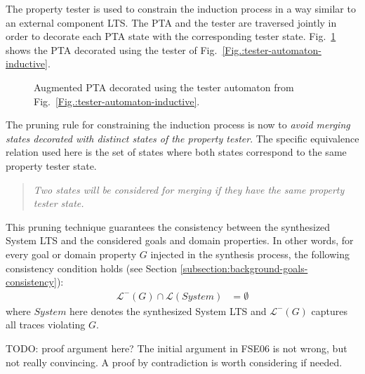 The property tester is used to constrain the induction process in a way similar to an external component LTS. The PTA and the tester are traversed jointly in order to decorate each PTA state with the corresponding tester state. Fig.~\ref{Fig.:goal-unfolded-pta} shows the PTA decorated using the tester of Fig.~\ref{Fig.:tester-automaton-inductive}.

\begin{figure}
\centering
{}
\caption{Augmented PTA decorated using the tester automaton from Fig.~\ref{Fig.:tester-automaton-inductive}\label{Fig.:goal-unfolded-pta}.}
\end{figure}

The pruning rule for constraining the induction process is now to \emph{avoid merging states decorated with distinct states of the property tester}. The specific equivalence relation used here is the set of states where both states correspond to the same property tester state. 
\begin{quote}
\emph{Two states will be considered for merging if they have the same property tester state.}
\end{quote}

This pruning technique guarantees the consistency between the synthesized System LTS and the considered goals and domain properties. In other words, for every goal or domain property $G$ injected in the synthesis process, the following consistency condition holds (see Section \ref{subsection:background-goals-consistency}):
\begin{align*}
\mathcal{L}^-(G) \cap \mathcal{L}(System) &= \emptyset
\end{align*}
\noindent where $System$ here denotes the synthesized System LTS and $\mathcal{L}^-(G)$ captures all traces violating $G$.

TODO: proof argument here? The initial argument in FSE06 is not wrong, but not really convincing. A proof by contradiction is worth considering if needed. 

